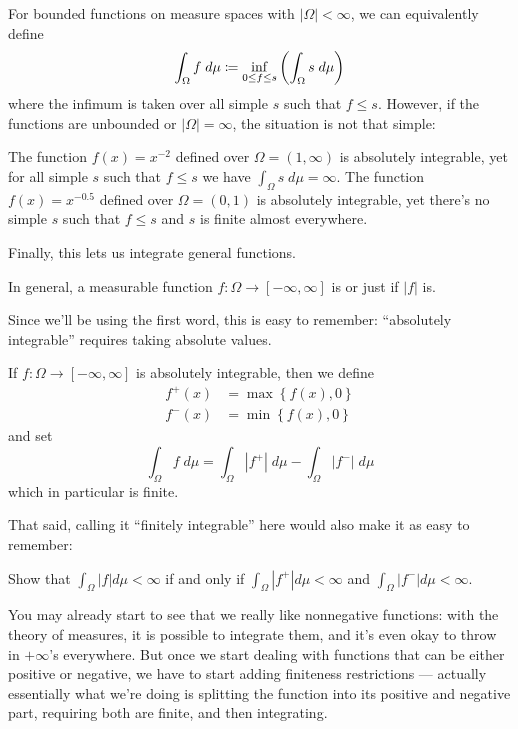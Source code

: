 \begin{remark}
	For bounded functions on measure spaces with $|\Omega| < \infty$, we can equivalently define
	\[ \int_\Omega f \; d\mu \coloneqq
		\inf_{0 \le f \le s} \left( \int_\Omega s \; d\mu \right) \]
	where the infimum is taken over all simple $s$ such that $f \leq s$.
	However, if the functions are unbounded or $|\Omega| = \infty$, the situation is not that
	simple:
	\begin{itemize}
		\ii The function $f(x) = x^{-2}$ defined over $\Omega = (1, \infty)$ is absolutely integrable,
		yet for all simple $s$ such that $f \leq s$ we have $\int_\Omega s \; d\mu = \infty$.
		\ii The function $f(x) = x^{-0.5}$ defined over $\Omega = (0, 1)$ is absolutely integrable,
		yet there's no simple $s$ such that $f \leq s$ and $s$ is finite almost everywhere.
	\end{itemize}
\end{remark}

Finally, this lets us integrate general functions.
\begin{definition}
	In general, a measurable function $f \colon \Omega \to [-\infty, \infty]$
	is  or just  if $|f|$ is.
\end{definition}
Since we'll be using the first word, this is easy to remember:
``absolutely integrable'' requires taking absolute values.

\begin{step}
	If $f \colon \Omega \to [-\infty, \infty]$ is absolutely integrable,
	then we define
	\begin{align*}
		f^+(x) &= \max\left\{ f(x), 0 \right\} \\
		f^-(x) &= \min\left\{ f(x), 0 \right\}
	\end{align*}
	and set
	\[ \int_\Omega f \; d\mu = \int_\Omega |f^+| \; d\mu
		- \int_\Omega |f^-| \; d\mu \]
	which in particular is finite.
\end{step}

That said, calling it ``finitely integrable'' here would also make it as easy to remember:
\begin{exercise}
	Show that $\int_\Omega |f| d\mu < \infty$ if and only if
	$\int_\Omega |f^+| d\mu < \infty$ and
	$\int_\Omega |f^-| d\mu < \infty$.
\end{exercise}

You may already start to see that we really like nonnegative functions:
with the theory of measures, it is possible to integrate them,
and it's even okay to throw in $+\infty$'s everywhere.
But once we start dealing with functions that can be either positive or negative,
we have to start adding finiteness restrictions ---
actually essentially what we're doing is splitting
the function into its positive and negative part,
requiring both are finite, and then integrating.


